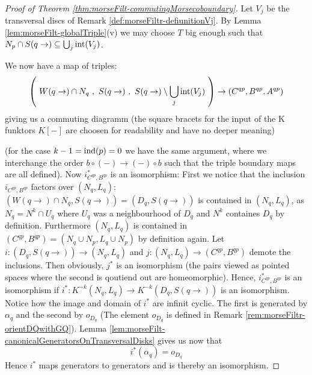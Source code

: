 \begin{proof}[Proof of Theorem \ref{thm:morseFilt-commutingMorsecoboundary}]
	Let $V_j$ be the transversal discs of Remark \ref{def:morseFiltr-defiunitionVj}. By Lemma \ref{lem:morseFilt-globalTriple}(v) we may choose $T$ big enough such that $N_p\cap S(q\to)\subseteq \bigcup_j \operatorname{\mathrm{int}}(V_j)$. 

    
    We now have a map of triples: 
	\begin{align*}
			\left( ~W(q\to)\cap N_q ~,~S(q\to)~,~S(q\to ) \setminus \bigcup\limits_j\operatorname{\mathrm{int}}(V_j) ~\right) \to (C^{qp},B^{qp},A^{qp})
		\end{align*} giving us a commuting diagramm (the square bracets for the input of the K funktors $K[-]$ are choosen for readability and have no deeper meaning)
		\begin{fdiagram}
			\label{diag:morseFiltr-boundaryMapsummonds}
		\end{fdiagram}
		(for the case $k-1=\mathrm{ind}(p)=0$ we have the same argument, where we interchange the order $b\circ (-)\to (-)\circ b$ such that the triple boundary maps are all defined). 
		Now $i^*_{C^{qp},B^{qp}}$ is an isomorphism: First we notice that the inclusion $i_{C^{qp},B^{qp}}$ factors over $(N_q,L_q)$: 
		$(W(q\to)\cap N_q,S(q\to))=(D_q,S(q\to))$ is contained in $(N_q,L_q)$, as $N_q=N^k\cap U_q$ where $U_q$ was a neighbourhood of $D_q$ and $N^k$ containes $D_q$ by definition. Furthermore  $(N_q,L_q)$ is contained in $(C^{qp},B^{qp})=(N_q\cup N_p,L_q \cup N_p)$ by definition again. 
		Let $i: (D_q,S(q\to)) \to (N_q,L_q)$ and $j:  (N_q,L_q) \to (C^{qp},B^{qp})$ demote the inclusions. Then obviously, $j^*$ is an isomorphism (the pairs viewed as pointed spaces where the second is qoutiend out are homeomorphic). Hence, $ i^*_{C^{qp},B^{qp}}$ is an isomorphism if $i^*:K^{-k}(N_q,L_q)\to K^{-k}(D_q,S(q\to))$ is an isomorphism. Notice how the image and domain of $i^*$ are infinit cyclic. The first is generated by $\alpha_q$ and the second by $o_{D_q}$ (The element $o_{D_q}$ is defined in Remark \ref{rem:morseFiltr-orientDQwithGQ}). Lemma \ref{lem:morseFilt-canonicalGeneratorsOnTransversalDisks} gives us now that 
		\begin{equation}\label{eq:morseFiltr-Proofreferenz}
			i^*(\alpha_q)=o_{D_q}
		\end{equation}
		 Hence $i^*$ maps generators to generators and is thereby an isomorphism. 
		

\end{proof}
